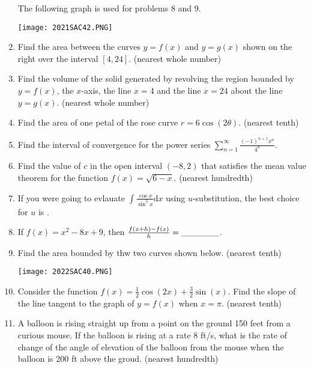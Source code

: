 \documentclass[../uilmath.tex]{subfiles}
\begin{document}
\begin{enumerate}[label=\bfseries\arabic*.]
    The following graph is used for problems 8 and 9.
    \begin{center}
        \texttt{[image: 2021SAC42.PNG]}
    \end{center}
    \item %
    Find the area between the curves $y=f(x)$ and $y=g(x)$ shown on the right over the interval $[4,24]$. (nearest whole number)

    \item %
    Find the volume of the solid generated by revolving the region bounded by $y=f(x)$, the $x$-axis, the line $x=4$ and 
    the line $x=24$ about the line $y=g(x)$. (nearest whole number)

    \item %
    Find the area of one petal of the rose curve $r=6\cos(2\theta)$. (nearest tenth)

    \item %
    Find the interval of convergence for the power series $\sum_{n=1}^\infty \frac{(-1)^{n+1}x^n}{4^n}$.

    \item %
    Find the value of $c$ in the open interval $(-8,2)$ that satisfies the mean value theorem for the function 
    $f(x)=\sqrt{6-x}$. (nearest hundredth)

    \item %
    If you were going to evlauate $\int \frac{\cos x}{\sin^3 x}\mathrm{d}x$ using $u$-substitution, the best choice for $u$ is \blank.

    \item %
    If $f(x)=x^2-8x+9$, then $\frac{f(x+h)-f(x)}{h}=\_\_\_\_\_\_$.

    \item %
    Find the area bounded by thw two curves shown below. (nearest tenth)
    \begin{center}
        \texttt{[image: 2022SAC40.PNG]}
    \end{center}

    \item %
    Consider the function $f(x)=\frac{1}{2}\cos(2x)+\frac{3}{2}\sin(x)$. Find the slope of the line tangent to 
    the graph of $y=f(x)$ when $x=\pi$. (nearest tenth)

    \item %
    A balloon is rising straight up from a point on the ground 150 feet from a curious mouse. If the balloon is rising at a 
    rate 8 ft/s, what is the rate of change of the angle of elevation of the balloon from the mouse when the balloon is 200 ft above the groud. (nearest hundredth)


\end{enumerate}
\end{document}
